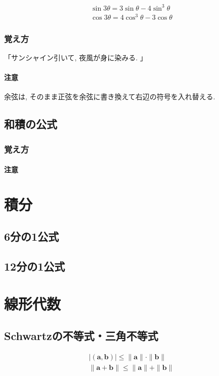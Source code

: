\documentclass[]{jreport}
\begin{document}
\begin{equation}
    \begin{array}{l}
        \sin3\theta=3\sin\theta-4\sin^3\theta\\
        \cos3\theta=4\cos^3\theta-3\cos\theta
    \end{array}
\end{equation}

\subsection{覚え方}
「サンシャイン引いて, 夜風が身に染みる. 」

\subsubsection{注意}
余弦は, そのまま正弦を余弦に書き換えて右辺の符号を入れ替える.

\section{和積の公式}
\subsection{覚え方}
\subsubsection{注意}

\chapter{積分}

\section{6分の1公式}

\section{12分の1公式}

\chapter{線形代数}

\section{Schwartzの不等式・三角不等式}
\begin{equation}
    \begin{array}{l}
        |(\bm{a}, \bm{b})|\le\|\bm{a}\|\cdot\|\bm{b}\|\\
        \|\bm{a}+\bm{b}\|\le\|\bm{a}\|+\|\bm{b}\|
    \end{array}
\end{equation}
\end{document}
